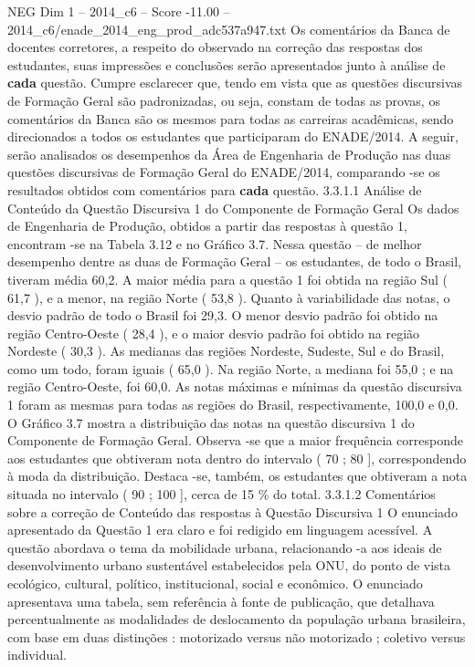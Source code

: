 \begin{textsample}{NEG Dim 1 – 2014\_c6 – Score -11.00 – 2014\_c6/enade\_2014\_eng\_prod\_adc537a947.txt}
Os comentários da Banca de docentes corretores, a respeito do observado na correção das respostas dos estudantes, suas impressões e conclusões serão apresentados junto à análise de \textbf{cada} questão.
Cumpre esclarecer que, tendo em vista que as questões discursivas de Formação Geral são padronizadas, ou seja, constam de todas as provas, os comentários da Banca são os mesmos para todas as carreiras acadêmicas, sendo direcionados a todos os estudantes que participaram do ENADE/2014.
A seguir, serão analisados os desempenhos da Área de Engenharia de Produção nas duas questões discursivas de Formação Geral do ENADE/2014, comparando -se os resultados obtidos com comentários para \textbf{cada} questão. 3.3.1.1 Análise de Conteúdo da Questão Discursiva 1 do Componente de Formação Geral Os dados de Engenharia de Produção, obtidos a partir das respostas à questão 1, encontram -se na Tabela 3.12 e no Gráfico 3.7.
Nessa questão – de melhor desempenho dentre as duas de Formação Geral – os estudantes, de todo o Brasil, tiveram média 60,2.
A maior média para a questão 1 foi obtida na região Sul ( 61,7 ), e a menor, na região Norte ( 53,8 ).
Quanto à variabilidade das notas, o desvio padrão de todo o Brasil foi 29,3.
O menor desvio padrão foi obtido na região Centro-Oeste ( 28,4 ), e o maior desvio padrão foi obtido na região Nordeste ( 30,3 ).
As medianas das regiões Nordeste, Sudeste, Sul e do Brasil, como um todo, foram iguais ( 65,0 ).
Na região Norte, a mediana foi 55,0 ; e na região Centro-Oeste, foi 60,0.
As notas máximas e mínimas da questão discursiva 1 foram as mesmas para todas as regiões do Brasil, respectivamente, 100,0 e 0,0.
O Gráfico 3.7 mostra a distribuição das notas na questão discursiva 1 do Componente de Formação Geral.
Observa -se que a maior frequência corresponde aos estudantes que obtiveram nota dentro do intervalo ( 70 ; 80 ], correspondendo à moda da distribuição.
Destaca -se, também, os estudantes que obtiveram a nota situada no intervalo ( 90 ; 100 ], cerca de 15 \% do total. 3.3.1.2 Comentários sobre a correção de Conteúdo das respostas à Questão Discursiva 1 O enunciado apresentado da Questão 1 era claro e foi redigido em linguagem acessível.
A questão abordava o tema da mobilidade urbana, relacionando -a aos ideais de desenvolvimento urbano sustentável estabelecidos pela ONU, do ponto de vista ecológico, cultural, político, institucional, social e econômico.
O enunciado apresentava uma tabela, sem referência à fonte de publicação, que detalhava percentualmente as modalidades de deslocamento da população urbana brasileira, com base em duas distinções : motorizado versus não motorizado ; coletivo versus individual.

\end{textsample}

